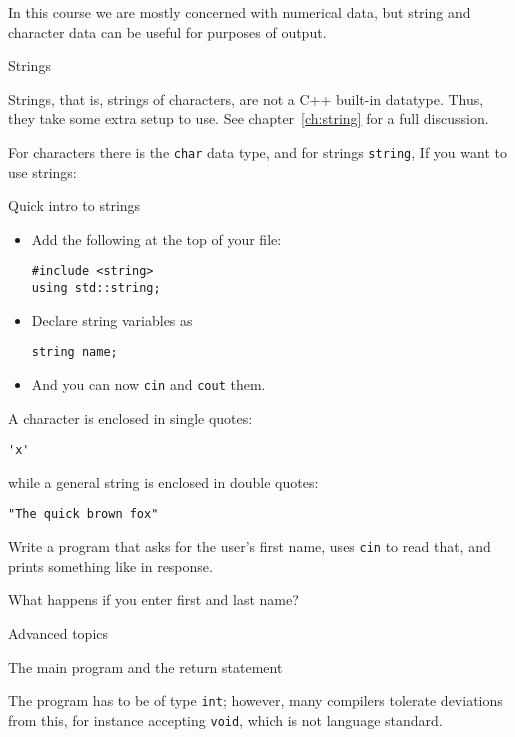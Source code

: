 In this course we are mostly concerned with numerical data,
but string and character data can be useful for purposes of output.

 {Strings}

Strings, that is, strings of characters, are not a C++ built-in
datatype. Thus, they take some extra setup to use.
See chapter~\ref{ch:string} for a full discussion.

For characters there is the \lstinline{char} data type,
and for strings \lstinline{string},
If you want to use strings:

\begin{block}{Quick intro to strings}
  \label{sl:quick-string}
  \begin{itemize}
  \item Add the following at the top of your file:
\begin{lstlisting}
#include <string>
using std::string;
\end{lstlisting}
\item Declare string variables as
\begin{lstlisting}
string name;
\end{lstlisting}
\item And you can now \lstinline{cin} and \lstinline{cout} them.
  \end{itemize}
\end{block}

A character is enclosed in single quotes:
\begin{lstlisting}
'x'
\end{lstlisting}
while a general string is enclosed in double quotes:
\begin{lstlisting}
"The quick brown fox"
\end{lstlisting}

\begin{exercise}
  \label{ex:ask-for-name}
  Write a program that asks for the user's first name, uses
  \lstinline{cin} to read that, and prints
  something like  in response.

  What happens if you enter first and last name?
\end{exercise}

 {Advanced topics}

 {The main program and the return statement}
\label{sec:int-main}

The  program has to be of type \lstinline{int};
however, many compilers tolerate deviations from this,
for instance accepting \lstinline{void},
which is not language standard.

